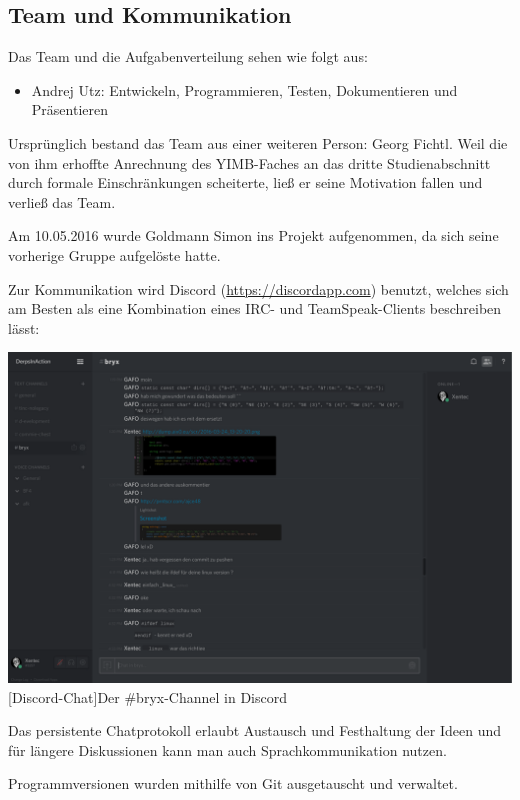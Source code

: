 \documentclass[12pt,a4paper]{article}
\begin{document}
\subsection{Team und Kommunikation}
Das Team und die Aufgabenverteilung sehen wie folgt aus:
\begin{itemize}
	\item Andrej Utz: Entwickeln, Programmieren, Testen, Dokumentieren und Präsentieren
\end{itemize}

Ursprünglich bestand das Team aus einer weiteren Person: Georg Fichtl. Weil die von ihm erhoffte Anrechnung des YIMB-Faches an das dritte Studienabschnitt durch formale Einschränkungen scheiterte, ließ er seine Motivation fallen und verließ das Team.

Am 10.05.2016 wurde Goldmann Simon ins Projekt aufgenommen, da sich seine vorherige Gruppe aufgelöste hatte.

Zur Kommunikation wird Discord (\url{https://discordapp.com}) benutzt, welches sich am Besten als eine Kombination eines IRC- und TeamSpeak-Clients
beschreiben lässt:

\begin{minipage}{\linewidth}
	\centering
	\includegraphics[width=0.6\linewidth]{pics/bryx-chat.png}
	[Discord-Chat]{Der \#bryx-Channel in Discord}
	\label{fig:discord}
\end{minipage}

Das persistente Chatprotokoll erlaubt Austausch und Festhaltung der Ideen und für längere Diskussionen kann man auch Sprachkommunikation nutzen.

Programmversionen wurden mithilfe von Git ausgetauscht und verwaltet.
\end{document}
